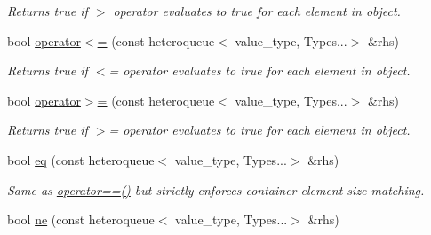 \begin{DoxyCompactItemize}
\begin{DoxyCompactList}\small\item\em Returns true if $>$ operator evaluates to true for each element in object. \end{DoxyCompactList}\item 
\hypertarget{classheterogeneous_1_1heteroqueue_3_01_t_00_01_types_8_8_8_4_ac442daf94f1dc7d753cd7d493b988ae2}{}bool \hyperlink{classheterogeneous_1_1heteroqueue_3_01_t_00_01_types_8_8_8_4_ac442daf94f1dc7d753cd7d493b988ae2}{operator$<$=} (const heteroqueue$<$ value\+\_\+type, Types...$>$ \&rhs)\label{classheterogeneous_1_1heteroqueue_3_01_t_00_01_types_8_8_8_4_ac442daf94f1dc7d753cd7d493b988ae2}

\begin{DoxyCompactList}\small\item\em Returns true if $<$= operator evaluates to true for each element in object. \end{DoxyCompactList}\item 
\hypertarget{classheterogeneous_1_1heteroqueue_3_01_t_00_01_types_8_8_8_4_a90fc06bb3197e552ff70604cc13fe181}{}bool \hyperlink{classheterogeneous_1_1heteroqueue_3_01_t_00_01_types_8_8_8_4_a90fc06bb3197e552ff70604cc13fe181}{operator$>$=} (const heteroqueue$<$ value\+\_\+type, Types...$>$ \&rhs)\label{classheterogeneous_1_1heteroqueue_3_01_t_00_01_types_8_8_8_4_a90fc06bb3197e552ff70604cc13fe181}

\begin{DoxyCompactList}\small\item\em Returns true if $>$= operator evaluates to true for each element in object. \end{DoxyCompactList}\item 
\hypertarget{classheterogeneous_1_1heteroqueue_3_01_t_00_01_types_8_8_8_4_abcef626d93983a131cd39aef5458c714}{}bool \hyperlink{classheterogeneous_1_1heteroqueue_3_01_t_00_01_types_8_8_8_4_abcef626d93983a131cd39aef5458c714}{eq} (const heteroqueue$<$ value\+\_\+type, Types...$>$ \&rhs)\label{classheterogeneous_1_1heteroqueue_3_01_t_00_01_types_8_8_8_4_abcef626d93983a131cd39aef5458c714}

\begin{DoxyCompactList}\small\item\em Same as \hyperlink{classheterogeneous_1_1heteroqueue_3_01_t_00_01_types_8_8_8_4_ab3c5d13590e42409aa467301fcb015ef}{operator==()} but strictly enforces container element size matching. \end{DoxyCompactList}\item 
\hypertarget{classheterogeneous_1_1heteroqueue_3_01_t_00_01_types_8_8_8_4_a62a8fb35f6781651c3ad9da81b4a2729}{}bool \hyperlink{classheterogeneous_1_1heteroqueue_3_01_t_00_01_types_8_8_8_4_a62a8fb35f6781651c3ad9da81b4a2729}{ne} (const heteroqueue$<$ value\+\_\+type, Types...$>$ \&rhs)\label{classheterogeneous_1_1heteroqueue_3_01_t_00_01_types_8_8_8_4_a62a8fb35f6781651c3ad9da81b4a2729}


\end{DoxyCompactItemize}

